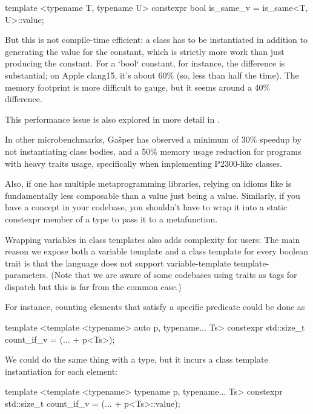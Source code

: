 \documentclass{wg21}
\begin{document}
\begin{colorblock}
template <typename T, typename U>
constexpr bool is_same_v = is_same<T, U>::value;
\end{colorblock}

But this is not compile-time efficient: a class has to be instantiated in addition to generating the value for the constant, which is strictly more work than just producing the constant.
For a `bool` constant, for instance, the difference is substantial; on Apple clang15, it's about 60\% (so, less than half the time).
The memory footprint is more difficult to gauge, but it seems around a 40\% difference.

This performance issue is also explored in more detail in .

In other microbenchmarks, Gašper has observed a minimum of 30\% speedup by not instantiating class bodies, and a 50\% memory usage reduction for programs with heavy traits usage, specifically when implementing P2300-like classes.

Also, if one has multiple metaprogramming libraries, relying on idioms like  is fundamentally less composable than a value just being a value.
Similarly, if you have a concept in your codebase, you shouldn't have to wrap it into a static constexpr  member of a type to pass it to a metafunction.

Wrapping variables in class templates also adds complexity for users: The main reason we expose both a variable template and a class template for every boolean trait is that the language does not support variable-template template-parameters. (Note that we are aware of some codebases using traits as tags for dispatch but this is far from the common case.)

For instance, counting elements that satisfy a specific predicate could be done as

\begin{colorblock}
template <template <typename> auto p, typename... Ts>
constexpr std::size_t count_if_v = (... + p<Ts>);
\end{colorblock}

We could do the same thing with a type, but it incurs a class template instantiation for each element:

\begin{colorblock}
template <template <typename> typename p, typename... Ts>
constexpr std::size_t count_if_v = (... + p<Ts>::value);
\end{colorblock}
\end{document}
